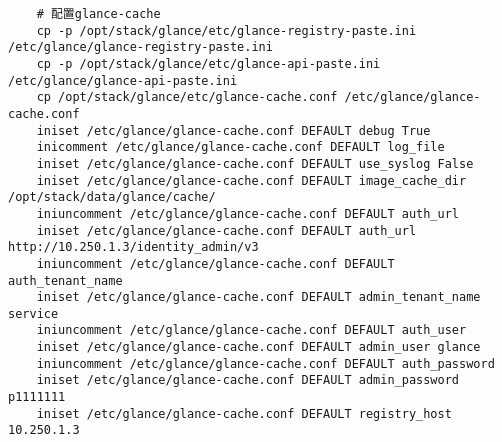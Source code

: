 \documentclass[a4paper,left=1.5cm,right=1.5cm,11pt]{article}
\begin{document}
\begin{lstlisting}
	# 配置glance-cache
	cp -p /opt/stack/glance/etc/glance-registry-paste.ini /etc/glance/glance-registry-paste.ini
    cp -p /opt/stack/glance/etc/glance-api-paste.ini /etc/glance/glance-api-paste.ini
    cp /opt/stack/glance/etc/glance-cache.conf /etc/glance/glance-cache.conf
    iniset /etc/glance/glance-cache.conf DEFAULT debug True
    inicomment /etc/glance/glance-cache.conf DEFAULT log_file
    iniset /etc/glance/glance-cache.conf DEFAULT use_syslog False
    iniset /etc/glance/glance-cache.conf DEFAULT image_cache_dir /opt/stack/data/glance/cache/
    iniuncomment /etc/glance/glance-cache.conf DEFAULT auth_url
    iniset /etc/glance/glance-cache.conf DEFAULT auth_url http://10.250.1.3/identity_admin/v3
    iniuncomment /etc/glance/glance-cache.conf DEFAULT auth_tenant_name
    iniset /etc/glance/glance-cache.conf DEFAULT admin_tenant_name service
    iniuncomment /etc/glance/glance-cache.conf DEFAULT auth_user
    iniset /etc/glance/glance-cache.conf DEFAULT admin_user glance
    iniuncomment /etc/glance/glance-cache.conf DEFAULT auth_password
    iniset /etc/glance/glance-cache.conf DEFAULT admin_password p1111111
    iniset /etc/glance/glance-cache.conf DEFAULT registry_host 10.250.1.3
	

\end{lstlisting}
\end{document}
